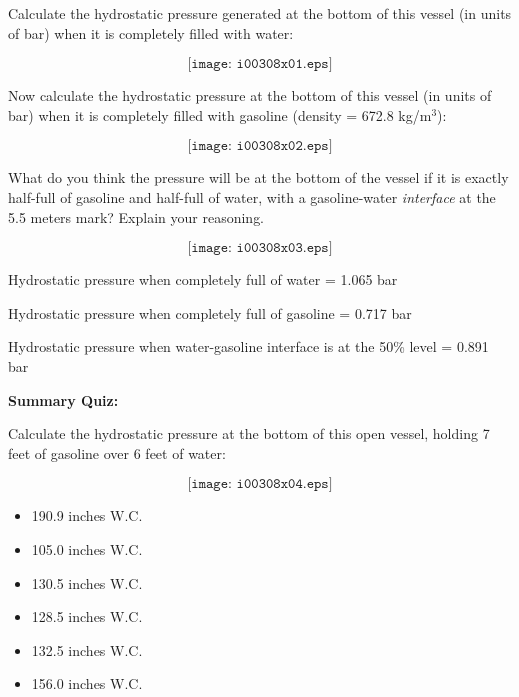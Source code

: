 

Calculate the hydrostatic pressure generated at the bottom of this vessel (in units of bar) when it is completely filled with water:

$$\texttt{[image: i00308x01.eps]}$$

Now calculate the hydrostatic pressure at the bottom of this vessel (in units of bar) when it is completely filled with gasoline (density = 672.8 kg/m$^{3}$):

$$\texttt{[image: i00308x02.eps]}$$

\filbreak

What do you think the pressure will be at the bottom of the vessel if it is exactly half-full of gasoline and half-full of water, with a gasoline-water {\it interface} at the 5.5 meters mark?  Explain your reasoning.

$$\texttt{[image: i00308x03.eps]}$$







Hydrostatic pressure when completely full of water = 1.065 bar

\vskip 10pt

Hydrostatic pressure when completely full of gasoline = 0.717 bar

\vskip 10pt

Hydrostatic pressure when water-gasoline interface is at the 50\% level = 0.891 bar








\vfil \eject

\noindent
{\bf Summary Quiz:}

Calculate the hydrostatic pressure at the bottom of this open vessel, holding 7 feet of gasoline over 6 feet of water:

$$\texttt{[image: i00308x04.eps]}$$

\begin{itemize}
\item{} 190.9 inches W.C.
\vskip 5pt 
\item{} 105.0 inches W.C.
\vskip 5pt 
\item{} 130.5 inches W.C.
\vskip 5pt 
\item{} 128.5 inches W.C.
\vskip 5pt 
\item{} 132.5 inches W.C.
\vskip 5pt 
\item{} 156.0 inches W.C.
\end{itemize}





